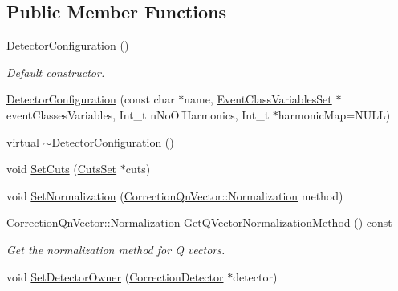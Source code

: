 \subsection*{Public Member Functions}
\begin{DoxyCompactItemize}
\item 
\mbox{\label{classQn_1_1DetectorConfiguration_aa4d47ee6636f8a0a16cf765ea5652717}} 
\mbox{\hyperlink{classQn_1_1DetectorConfiguration_aa4d47ee6636f8a0a16cf765ea5652717}{Detector\+Configuration}} ()
\begin{DoxyCompactList}\small\item\em Default constructor. \end{DoxyCompactList}\item 
\mbox{\hyperlink{classQn_1_1DetectorConfiguration_ace49da97614ea3268a6483a5f0b4a1c5}{Detector\+Configuration}} (const char $\ast$name, \mbox{\hyperlink{classQn_1_1EventClassVariablesSet}{Event\+Class\+Variables\+Set}} $\ast$event\+Classes\+Variables, Int\+\_\+t n\+No\+Of\+Harmonics, Int\+\_\+t $\ast$harmonic\+Map=N\+U\+LL)
\item 
virtual \mbox{\hyperlink{classQn_1_1DetectorConfiguration_a19aab70fc76c6adf6af8586e74c85048}{$\sim$\+Detector\+Configuration}} ()
\item 
void \mbox{\hyperlink{classQn_1_1DetectorConfiguration_a740b364553bfc9306e6b486093dcf227}{Set\+Cuts}} (\mbox{\hyperlink{classQn_1_1CutsSet}{Cuts\+Set}} $\ast$cuts)
\item 
void \mbox{\hyperlink{classQn_1_1DetectorConfiguration_a018d9391fa2fbe6fe3c3d1dd5c3389d7}{Set\+Normalization}} (\mbox{\hyperlink{classQn_1_1CorrectionQnVector_a2998fe4babb716c57848c8c73b24a398}{Correction\+Qn\+Vector\+::\+Normalization}} method)
\item 
\mbox{\label{classQn_1_1DetectorConfiguration_ae260877a44955bddcc5ae238f07a33d0}} 
\mbox{\hyperlink{classQn_1_1CorrectionQnVector_a2998fe4babb716c57848c8c73b24a398}{Correction\+Qn\+Vector\+::\+Normalization}} \mbox{\hyperlink{classQn_1_1DetectorConfiguration_ae260877a44955bddcc5ae238f07a33d0}{Get\+Q\+Vector\+Normalization\+Method}} () const
\begin{DoxyCompactList}\small\item\em Get the normalization method for Q vectors. \end{DoxyCompactList}\item 
void \mbox{\hyperlink{classQn_1_1DetectorConfiguration_a100aab7b32a43830dc1dc9eac5b2a158}{Set\+Detector\+Owner}} (\mbox{\hyperlink{classQn_1_1CorrectionDetector}{Correction\+Detector}} $\ast$detector)

\end{DoxyCompactItemize}
